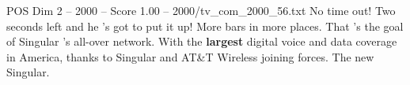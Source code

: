 \begin{textsample}{POS Dim 2 – 2000 – Score 1.00 – 2000/tv\_com\_2000\_56.txt}  \label{ex:f2_pos_088}
No time out!
Two seconds left and he 's got to put it up!
More bars in more places.
That 's the goal of Singular 's all-over network.
With the \textbf{largest} digital voice and data coverage in America, thanks to Singular and AT\&T Wireless joining forces.
The new Singular.

\end{textsample}
